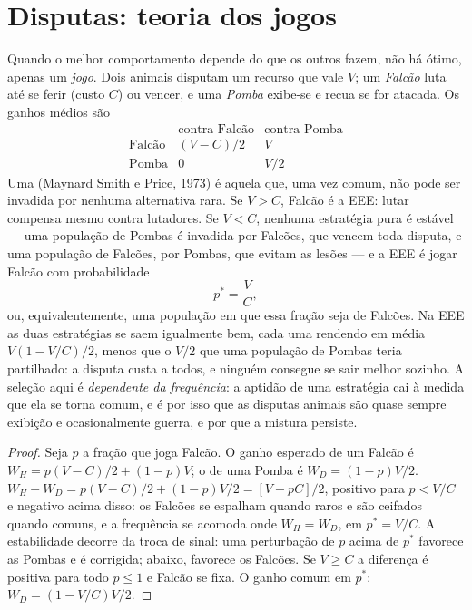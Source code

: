 \section{Disputas: teoria dos jogos}

\begin{proposition}\label{prop:b3:behavioural-ecology:hawk-dove}
Quando o melhor comportamento depende do que os outros fazem, não há
ótimo, apenas um \emph{jogo}. Dois animais disputam um recurso que vale
$V$; um \emph{Falcão} luta até se ferir (custo $C$) ou vencer, e uma
\emph{Pomba} exibe-se e recua se for atacada. Os ganhos médios são
\[
\begin{array}{c|cc}
 & \text{contra Falcão} & \text{contra Pomba}\\ \hline
\text{Falcão} & (V - C)/2 & V\\
\text{Pomba} & 0 & V/2
\end{array}
\]
Uma \emph{} (Maynard Smith e Price,
1973) é aquela que, uma vez comum, não pode ser invadida por nenhuma
alternativa rara. Se $V > C$, Falcão é a EEE: lutar compensa mesmo contra
lutadores. Se $V
< C$, nenhuma estratégia pura é estável --- uma
população de Pombas é invadida por Falcões, que vencem toda disputa, e
uma população de Falcões, por Pombas, que evitam as lesões --- e a EEE é
jogar Falcão com probabilidade
\[
p^{*} = \frac{V}{C},
\]
ou, equivalentemente, uma população em que essa fração seja de Falcões.
Na EEE as duas estratégias se saem igualmente bem, cada uma rendendo em
média $V(1 -
V/C)/2$, menos que o $V/2$ que uma população de Pombas
teria partilhado: a disputa custa a todos, e ninguém consegue se sair
melhor sozinho. A seleção aqui é \emph{dependente da frequência}: a
aptidão de uma estratégia cai à medida que ela se torna comum, e é por
isso que as disputas animais são quase sempre exibição e ocasionalmente
guerra, e por que a mistura persiste.
\end{proposition}
\begin{proof}
Seja $p$ a fração que joga Falcão. O ganho esperado de um Falcão é
$W_{H} = p(V
- C)/2 + (1 - p)V$; o de uma Pomba é $W_{D} = (1 - p)V/2$.
$W_{H} - W_{D} =
p(V - C)/2 + (1 - p)V/2 = [V - pC]/2$, positivo para $p < V/C$ e negativo acima disso: os Falcões se espalham quando raros e são
ceifados quando comuns, e a frequência se acomoda onde $W_{H} = W_{D}$,
em $p^{*} = V/C$. A estabilidade decorre da troca de sinal: uma
perturbação de $p$ acima de $p^{*}$ favorece as Pombas e é corrigida;
abaixo, favorece os Falcões. Se $V
\ge C$ a diferença é positiva para
todo $p \le 1$ e Falcão se fixa. O ganho comum em $p^{*}$: $W_{D} = (1 - V/C)V/2$.
\end{proof}

